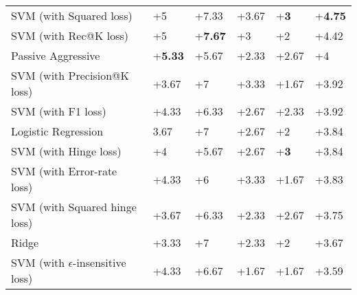 \begin{table}[h!]
{\begin{tabular}{@{}llllll@{}}
SVM (with Squared loss)                               & +5                       & +7.33                       & +3.67                    & +\textbf{3}                          & +\textbf{4.75}             \\ 
SVM (with Rec@K loss)                                                                      & +5                       & +\textbf{7.67}                       & +{3}              & +2                          & +{4.42}    \\ 
Passive Aggressive                                       & +\textbf{5.33}           & +5.67              & +2.33                    & +2.67                       & +4                \\ 
SVM (with Precision@K loss)                                                                 & +3.67                    & +7                          & +3.33                    & +{1.67}              & +3.92             \\ 
SVM (with F1 loss)                                                                          & +4.33                    & +6.33                       & +2.67                    & +2.33                       & +3.92             \\ 
Logistic Regression                                                      & 3.67                    & +7                          & +2.67                    & +2                          & +3.84             \\ 
SVM (with Hinge loss)                                                                        & +4                       & +5.67                       & +2.67                    & +\textbf{3}                          & +3.84             \\ 
SVM (with Error-rate loss)                                                                    & +4.33                    & +6                          & +3.33                    & +1.67                       & +3.83             \\ 
SVM (with Squared hinge loss)                                                              & +3.67                    & +6.33                       & +2.33                    & +2.67                       & +3.75             \\ 
Ridge                                                             & +3.33                    & +7                          & +2.33                    & +2                          & +3.67             \\ 
SVM (with $\epsilon$-insensitive loss)                         & +4.33                    & +6.67                       & +1.67                    & +1.67                       & +3.59             \\ 

\end{tabular}}
\end{table}
